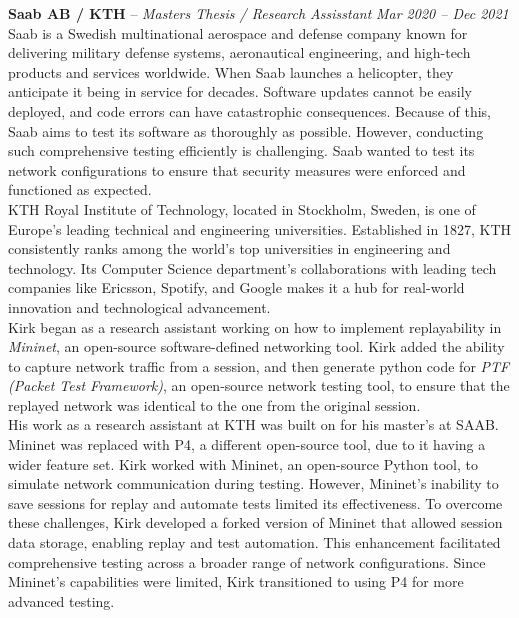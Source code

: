 \documentclass[10pt,letterpaper]{article}
\begin{document}
\headedsection
{\textbf{Saab AB / KTH} -- \textit{Masters Thesis / Research Assisstant}}
{\textit{Mar 2020 -- Dec 2021}} { \\

	Saab is a Swedish multinational aerospace and defense company known for delivering military defense systems, aeronautical engineering, and high-tech products and services worldwide. When Saab launches a helicopter, they anticipate it being in service for decades. Software updates cannot be easily deployed, and code errors can have catastrophic consequences. Because of this, Saab aims to test its software as thoroughly as possible.	However, conducting such comprehensive testing efficiently is challenging. Saab wanted to test its network configurations to ensure that security measures were enforced and functioned as expected. \\

	KTH Royal Institute of Technology, located in Stockholm, Sweden, is one of Europe’s leading technical and engineering universities. Established in 1827, KTH consistently ranks among the world’s top universities in engineering and technology. Its Computer Science department's collaborations with leading tech companies like Ericsson, Spotify, and Google makes it a hub for real-world innovation and technological advancement. \\

	Kirk began as a research assistant working on how to implement replayability in {\it Mininet}, an open-source software-defined networking tool. Kirk added the ability to capture network traffic from a session, and then generate python code for {\it PTF (Packet Test Framework)}, an open-source network testing tool, to ensure that the replayed network was identical to the one from the original session. \\

	His work as a research assistant at KTH was built on for his master's at SAAB. Mininet was replaced with P4, a different open-source tool, due to it having a wider feature set. Kirk worked with Mininet, an open-source Python tool, to simulate network communication during testing. However, Mininet's inability to save sessions for replay and automate tests limited its effectiveness. To overcome these challenges, Kirk developed a forked version of Mininet that allowed session data storage, enabling replay and test automation. This enhancement facilitated comprehensive testing across a broader range of network configurations. Since Mininet’s capabilities were limited, Kirk transitioned to using P4 for more advanced testing. \\

}
\end{document}
